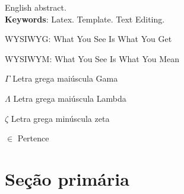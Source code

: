 \documentclass[
	12pt,    %
	oneside, %
	a4paper, %
	chapter=TITLE, %
	section=TITLE, %
	sumario=tradicional, %
	english, %
	brazil   %
] {abntex2}
\begin{document}
	\begin{resumo}[Abstract]
		English abstract.
		\vspace{\onelineskip}
		\noindent \\
		\textbf{Keywords}: Latex. Template. Text Editing.	
	\end{resumo}
	
	\renewcommand\listfigurename{LISTA DE FIGURAS}	
	\listoffigures
	\cleardoublepage
	
	\renewcommand\listtablename{LISTA DE TABELAS}	
	\listoftables
	\cleardoublepage

	\begin{siglas}
		\item[WYSIWYG:] What You See Is What You Get
		\item[WYSIWYM:] What You See Is What You Mean		
	\end{siglas}
	
	\begin{simbolos}
		\item[$ \Gamma $] Letra grega maiúscula Gama
		\item[$ \Lambda $] Letra grega maiúscula Lambda		
		\item[$ \zeta$] Letra grega minúscula zeta
		\item[$ \in $] Pertence
	\end{simbolos}	

	\tableofcontents*
	\cleardoublepage	
	
	\textual	

	\chapter{Seção primária}\label{sec:primaria}
\end{document}
